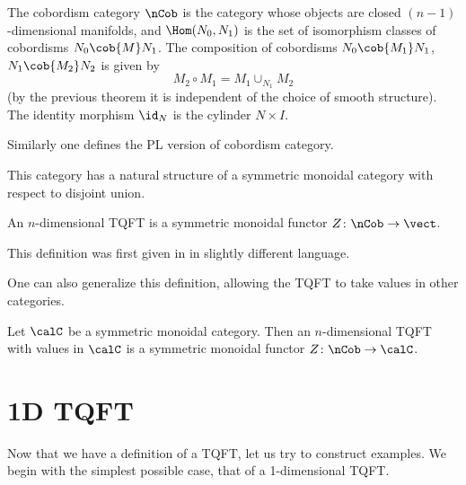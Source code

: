 \begin{definition}\label{d:ncob}
  The cobordism category $\nCob$ is the category whose objects are closed
  $(n-1)$-dimensional manifolds, and $\Hom(N_0, N_1)$ is the set of
  isomorphism classes of cobordisms $N_0\cob{M}N_1$. The composition of
  cobordisms $N_0\cob{M_1}N_1$, $N_1\cob{M_2}N_2$
  is given by
  $$
    M_2\circ M_1 = M_1\cup_{N_1} M_2
  $$
  (by the previous theorem it is independent of the choice of smooth structure).
  The identity morphism $\id_N$ is the cylinder $N\times I$.
\end{definition}
Similarly one defines the PL version of cobordism category.

This category has a natural structure of a symmetric monoidal
category with respect to disjoint union.

\begin{definition}\label{d:tqft}
  An $n$-dimensional TQFT is a symmetric
  monoidal functor $Z\colon \nCob\to \vect$.
\end{definition}
This definition was first given in  in slightly different
language.

One can also generalize this definition, allowing the TQFT to take values in
other categories.

\begin{definition}\label{d:tqft-c}
  Let $\calC$ be a symmetric monoidal category. Then an
  $n$-dimensional TQFT with values in $\calC$ is a symmetric
    monoidal functor $Z\colon \nCob\to \calC$.
\end{definition}
\section{1D TQFT}\label{s:1d-tqft}

Now that we have a definition of a TQFT, let us try to construct examples. We
begin with the simplest possible case, that of a 1-dimensional TQFT.

